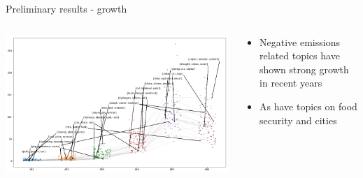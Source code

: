 \documentclass[9pt]{beamer}
\begin{document}
\begin{frame}{Preliminary results - growth}

\begin{columns}
	\begin{column}{0.6\linewidth}
		\begin{center}
			\includegraphics[width=\linewidth]{../plots/hot_topics_65.png}
		\end{center}
	\end{column}
	\begin{column}{0.4\linewidth}
		\begin{center}
			\begin{itemize}
				\item Negative emissions related topics have shown strong growth in recent years
				\item As have topics on food security and cities
			\end{itemize}
		\end{center}
	\end{column}
\end{columns}

\end{frame}
\end{document}
